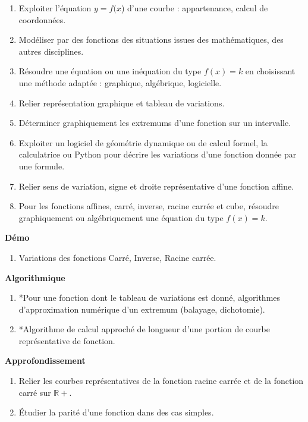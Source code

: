 \documentclass[10pt,a4paper]{article}
\begin{document}
\begin{enumerate}
\item Exploiter l'équation $y = f(x$) d'une courbe : appartenance, calcul de coordonnées.
\item Modéliser par des fonctions des situations issues des mathématiques, des autres 
disciplines.
\item  Résoudre une équation ou une inéquation du type $f(x) = k$ en choisissant une méthode adaptée : graphique, algébrique, logicielle.
\item Relier représentation graphique et tableau de variations.
\item  Déterminer graphiquement les extremums d'une fonction sur un intervalle.
\item  Exploiter un logiciel de géométrie dynamique ou de calcul formel, la calculatrice ou 
Python pour décrire les variations d'une fonction donnée par une formule.
\item  Relier sens de variation, signe et droite représentative d'une fonction affine.
\item  Pour les fonctions affines, carré, inverse, racine carrée et cube, résoudre 
graphiquement ou algébriquement une équation du type $f(x) = k$.
\end{enumerate}
 
\textbf{Démo}

\begin{enumerate}
\item Variations des fonctions Carré, Inverse, Racine carrée.
\end{enumerate}
 
\textbf{Algorithmique}

\begin{enumerate}
\item *Pour une fonction dont le tableau de variations est donné, algorithmes d'approximation numérique d'un extremum (balayage, dichotomie).
\item *Algorithme de calcul approché de longueur d'une portion de courbe représentative de fonction.
\end{enumerate}

\textbf{Approfondissement}

\begin{enumerate}
\item Relier les courbes représentatives de la fonction racine carrée et de la fonction carré sur $\mathbb R+$.
\item Étudier la parité d'une fonction dans des cas simples.
\end{enumerate}
\end{document}
